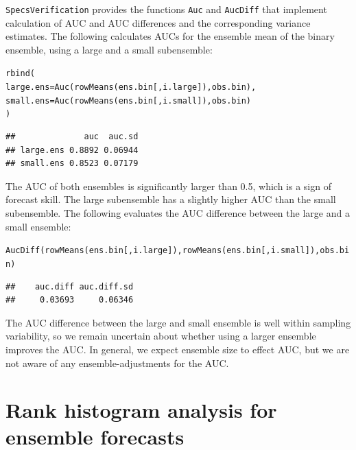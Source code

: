 \documentclass[10pt]{article}\usepackage[]{graphicx}\usepackage[]{color}
\makeatletter
\newcommand{\hlstd}[1]{\textcolor[rgb]{0,0,0}{#1}}%
\newcommand{\hlkwc}[1]{\textcolor[rgb]{0,0.502,0.753}{#1}}%
\newcommand{\hlkwd}[1]{\textcolor[rgb]{0,0.267,0.4}{#1}}%
\newenvironment{kframe}{%
 \def\at@end@of@kframe{}%
 \ifinner\ifhmode%
  \def\at@end@of@kframe{\end{minipage}}%
  \begin{minipage}{\columnwidth}%
 \fi\fi%
 \def\FrameCommand##1{\hskip\@totalleftmargin \hskip-\fboxsep
 \colorbox{shadecolor}{##1}\hskip-\fboxsep
     \hskip-\linewidth \hskip-\@totalleftmargin \hskip\columnwidth}%
 \MakeFramed {\advance\hsize-\width
   \@totalleftmargin\z@ \linewidth\hsize
   \@setminipage}}%
 {\par\unskip\endMakeFramed%
 \at@end@of@kframe}
\newenvironment{knitrout}{}{} %
\newcommand{\pkg}[1]{\texttt{#1}}
\newcommand{\code}[1]{\texttt{#1}}
\makeatother
\begin{document}
\pkg{SpecsVerification} provides the functions \code{Auc} and \code{AucDiff} that implement calculation of AUC and AUC differences and the corresponding variance estimates.
The following calculates AUCs for the ensemble mean of the binary ensemble, using a large and a small subensemble:
%
\begin{knitrout}
\color{fgcolor}\begin{kframe}
\begin{alltt}
\hlkwd{rbind}\hlstd{(}
  \hlkwc{large.ens} \hlstd{=} \hlkwd{Auc}\hlstd{(}\hlkwd{rowMeans}\hlstd{(ens.bin[, i.large]), obs.bin),}
  \hlkwc{small.ens} \hlstd{=} \hlkwd{Auc}\hlstd{(}\hlkwd{rowMeans}\hlstd{(ens.bin[, i.small]), obs.bin)}
\hlstd{)}
\end{alltt}
\begin{verbatim}
##              auc  auc.sd
## large.ens 0.8892 0.06944
## small.ens 0.8523 0.07179
\end{verbatim}
\end{kframe}
\end{knitrout}
%
The AUC of both ensembles is significantly larger than 0.5, which is a sign of forecast skill.
The large subensemble has a slightly higher AUC than the small subensemble.
The following evaluates the AUC difference between the large and a small ensemble:
%
\begin{knitrout}
\color{fgcolor}\begin{kframe}
\begin{alltt}
\hlkwd{AucDiff}\hlstd{(}\hlkwd{rowMeans}\hlstd{(ens.bin[, i.large]),} \hlkwd{rowMeans}\hlstd{(ens.bin[, i.small]), obs.bin)}
\end{alltt}
\begin{verbatim}
##    auc.diff auc.diff.sd 
##     0.03693     0.06346
\end{verbatim}
\end{kframe}
\end{knitrout}
%
The AUC difference between the large and small ensemble is well within sampling variability, so we remain uncertain about whether using a larger ensemble improves the AUC.
In general, we expect ensemble size to effect AUC, but we are not aware of any ensemble-adjustments for the AUC. 



\section{Rank histogram analysis for ensemble forecasts}
\end{document}
